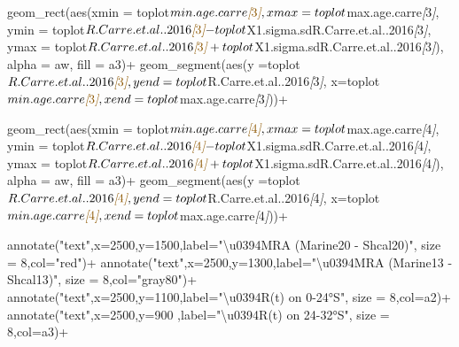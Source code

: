 \documentclass[
]{article}
\newenvironment{Shaded}{\begin{snugshade}}{\end{snugshade}}
\newcommand{\CommentTok}[1]{\textcolor[rgb]{0.56,0.35,0.01}{\textit{#1}}}
\newcommand{\NormalTok}[1]{#1}
\newcommand{\OtherTok}[1]{\textcolor[rgb]{0.56,0.35,0.01}{#1}}
\begin{document}
\begin{Shaded}
\begin{Highlighting}[]
\NormalTok{  geom\_rect(aes(xmin = toplot$min.age.carre}\CommentTok{[}\OtherTok{3}\CommentTok{]}\NormalTok{, }
\NormalTok{                xmax = toplot$max.age.carre}\CommentTok{[}\OtherTok{3}\CommentTok{]}\NormalTok{, }
\NormalTok{                ymin = toplot$R.Carre.et.al..2016}\CommentTok{[}\OtherTok{3}\CommentTok{]}\NormalTok{{-}toplot$X1.sigma.sdR.Carre.et.al..2016}\CommentTok{[}\OtherTok{3}\CommentTok{]}\NormalTok{,}
\NormalTok{                ymax = toplot$R.Carre.et.al..2016}\CommentTok{[}\OtherTok{3}\CommentTok{]}\NormalTok{+toplot$X1.sigma.sdR.Carre.et.al..2016}\CommentTok{[}\OtherTok{3}\CommentTok{]}\NormalTok{),}
\NormalTok{            alpha = aw,}
\NormalTok{            fill = a3)+}
\NormalTok{  geom\_segment(aes(y =toplot$R.Carre.et.al..2016}\CommentTok{[}\OtherTok{3}\CommentTok{]}\NormalTok{,}
\NormalTok{                   yend =toplot$R.Carre.et.al..2016}\CommentTok{[}\OtherTok{3}\CommentTok{]}\NormalTok{,}
\NormalTok{                   x=toplot$min.age.carre}\CommentTok{[}\OtherTok{3}\CommentTok{]}\NormalTok{,}
\NormalTok{                   xend=toplot$max.age.carre}\CommentTok{[}\OtherTok{3}\CommentTok{]}\NormalTok{))+}
  
\NormalTok{  geom\_rect(aes(xmin = toplot$min.age.carre}\CommentTok{[}\OtherTok{4}\CommentTok{]}\NormalTok{, }
\NormalTok{                xmax = toplot$max.age.carre}\CommentTok{[}\OtherTok{4}\CommentTok{]}\NormalTok{, }
\NormalTok{                ymin = toplot$R.Carre.et.al..2016}\CommentTok{[}\OtherTok{4}\CommentTok{]}\NormalTok{{-}toplot$X1.sigma.sdR.Carre.et.al..2016}\CommentTok{[}\OtherTok{4}\CommentTok{]}\NormalTok{,}
\NormalTok{                ymax = toplot$R.Carre.et.al..2016}\CommentTok{[}\OtherTok{4}\CommentTok{]}\NormalTok{+toplot$X1.sigma.sdR.Carre.et.al..2016}\CommentTok{[}\OtherTok{4}\CommentTok{]}\NormalTok{),}
\NormalTok{            alpha = aw,}
\NormalTok{            fill = a3)+}
\NormalTok{  geom\_segment(aes(y =toplot$R.Carre.et.al..2016}\CommentTok{[}\OtherTok{4}\CommentTok{]}\NormalTok{,}
\NormalTok{                   yend =toplot$R.Carre.et.al..2016}\CommentTok{[}\OtherTok{4}\CommentTok{]}\NormalTok{,}
\NormalTok{                   x=toplot$min.age.carre}\CommentTok{[}\OtherTok{4}\CommentTok{]}\NormalTok{,}
\NormalTok{                   xend=toplot$max.age.carre}\CommentTok{[}\OtherTok{4}\CommentTok{]}\NormalTok{))+}

\NormalTok{  annotate("text",x=2500,y=1500,label="\textbackslash{}u0394MRA (Marine20 {-} Shcal20)", size = 8,col="red")+}
\NormalTok{  annotate("text",x=2500,y=1300,label="\textbackslash{}u0394MRA (Marine13 {-} Shcal13)", size = 8,col="gray80")+}
\NormalTok{  annotate("text",x=2500,y=1100,label="\textbackslash{}u0394R(t) on  0{-}24°S", size = 8,col=a2)+}
\NormalTok{  annotate("text",x=2500,y=900 ,label="\textbackslash{}u0394R(t) on 24{-}32°S", size = 8,col=a3)+}
  

\end{Highlighting}
\end{Shaded}
\end{document}
